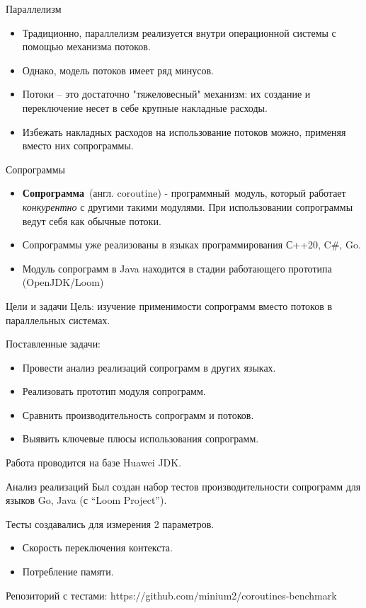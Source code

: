 \begin{frame}{Параллелизм}
	\begin{itemize}
	\item Традиционно, параллелизм реализуется внутри операционной системы с помощью механизма потоков.
	\item Однако, модель потоков имеет ряд минусов. 
	\item Потоки -- это достаточно "тяжеловесный" механизм: их создание и переключение несет в себе крупные накладные расходы. 
	\item Избежать накладных расходов на использование потоков можно, применяя вместо них сопрограммы. 
	\end{itemize}
\end{frame}

\begin{frame}{Сопрограммы}
	\begin{itemize}
		\item \textbf{Сопрограмма} (англ. coroutine) - программный модуль, который работает 
		\textit{конкурентно} с другими такими модулями. При использовании сопрограммы ведут себя как обычные потоки.
		
		\item Сопрограммы уже реализованы в языках программирования С++20, C\#, Go.
		\item Модуль сопрограмм в Java находится в стадии работающего прототипа (OpenJDK/Loom)
	\end{itemize}
\end{frame}

\begin{frame}{Цели и задачи}
	Цель: изучение применимости сопрограмм вместо потоков в параллельных системах.
	\par
	Поставленные задачи:
	\begin{itemize}
		\item Провести анализ реализаций сопрограмм в других языках.
		\item Реализовать прототип модуля сопрограмм.
		\item Сравнить производительность сопрограмм и потоков.
		\item Выявить ключевые плюсы использования сопрограмм.
	\end{itemize}
	Работа проводится на базе Huawei JDK.
\end{frame} 

\begin{frame}{Анализ реализаций}
	Был создан набор тестов производительности сопрограмм для языков Go, Java (с “Loom Project”).
	
	Тесты создавались для измерения 2 параметров.
	\begin{itemize}
		\item Скорость переключения контекста.
		\item Потребление памяти.
	\end{itemize}
	Репозиторий с тестами: https://github.com/minium2/coroutines-benchmark
\end{frame}

